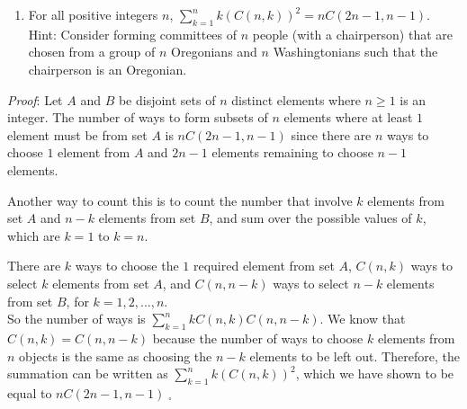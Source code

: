 \documentclass[12pt]{amsart}
\theoremstyle{definition}
\theoremstyle{remark}
\begin{document}
\begin{enumerate}
\newpage

\item For all positive integers $n$, $\displaystyle \sum_{k=1}^n k(C(n,k))^2=n C(2n-1,n-1)$.\\

Hint:  Consider forming committees of $n$ people (with a chairperson) that are chosen from a group of $n$ Oregonians and $n$ Washingtonians such that the chairperson is an Oregonian.

\end{enumerate}

\bigskip
\bigskip

\emph{Proof}: Let $A$ and $B$ be disjoint sets of $n$ distinct elements where $n\geq 1$ is an integer.
The number of ways to form subsets of $n$ elements where at least $1$ element must be from set $A$ is $nC(2n-1,n-1)$ since there are $n$ ways to choose $1$ element from $A$ and $2n-1$ elements remaining to choose $n-1$ elements.

Another way to count this is to count the number that involve $k$ elements from set $A$ and $n-k$ elements from set $B$, and sum over the possible values of $k$, which are $k=1$ to $k=n$.

There are $k$ ways to choose the $1$ required element from set $A$, $C(n, k)$ ways to select $k$ elements from set $A$, and $C(n, n-k)$ ways to select $n-k$ elements from set $B$, for $k=1, 2,..., n$. \\
So the number of ways is $\displaystyle \sum_{k=1}^n kC(n,k)C(n, n-k)$.
We know that $C(n,k)=C(n,n-k)$ because the number of ways to choose $k$ elements from $n$ objects is the same as choosing the $n-k$ elements to be left out.
Therefore, the summation can be written as $\displaystyle \sum_{k=1}^n k(C(n,k))^2$, which we have shown to be equal to $\displaystyle nC(2n-1,n-1)\;_{\square}$ \\
\end{document}
